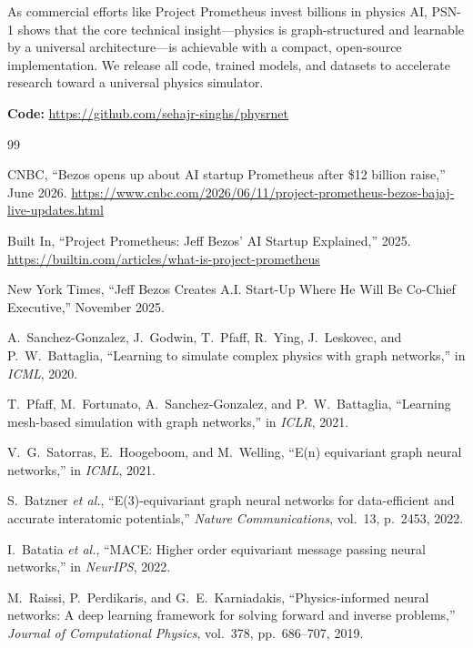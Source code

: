 \documentclass[11pt,a4paper]{article}
\begin{document}
As commercial efforts like Project Prometheus invest billions in physics AI, PSN-1 shows that the core technical insight---physics is graph-structured and learnable by a universal architecture---is achievable with a compact, open-source implementation. We release all code, trained models, and datasets to accelerate research toward a universal physics simulator.

\vspace{12pt}
\noindent\textbf{Code:} \url{https://github.com/sehajr-singhs/physrnet}

\begin{thebibliography}{99}

CNBC, ``Bezos opens up about AI startup Prometheus after \$12 billion raise,''
June 2026. \url{https://www.cnbc.com/2026/06/11/project-prometheus-bezos-bajaj-live-updates.html}

Built In, ``Project Prometheus: Jeff Bezos' AI Startup Explained,''
2025. \url{https://builtin.com/articles/what-is-project-prometheus}

New York Times, ``Jeff Bezos Creates A.I. Start-Up Where He Will Be Co-Chief Executive,''
November 2025.

A.~Sanchez-Gonzalez, J.~Godwin, T.~Pfaff, R.~Ying, J.~Leskovec, and P.~W.~Battaglia,
``Learning to simulate complex physics with graph networks,''
in \textit{ICML}, 2020.

T.~Pfaff, M.~Fortunato, A.~Sanchez-Gonzalez, and P.~W.~Battaglia,
``Learning mesh-based simulation with graph networks,''
in \textit{ICLR}, 2021.

V.~G.~Satorras, E.~Hoogeboom, and M.~Welling,
``E(n) equivariant graph neural networks,''
in \textit{ICML}, 2021.

S.~Batzner \emph{et al.},
``E(3)-equivariant graph neural networks for data-efficient and accurate interatomic potentials,''
\textit{Nature Communications}, vol.~13, p.~2453, 2022.

I.~Batatia \emph{et al.},
``MACE: Higher order equivariant message passing neural networks,''
in \textit{NeurIPS}, 2022.

M.~Raissi, P.~Perdikaris, and G.~E.~Karniadakis,
``Physics-informed neural networks: A deep learning framework for solving forward and inverse problems,''
\textit{Journal of Computational Physics}, vol.~378, pp.~686--707, 2019.


\end{thebibliography}
\end{document}
